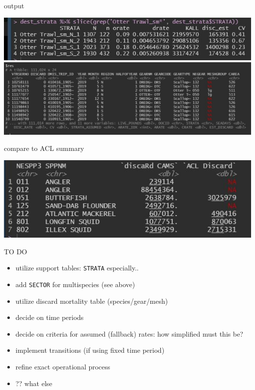 \documentclass[
  ignorenonframetext,
]{beamer}
\providecommand{\tightlist}{%
  \setlength{\itemsep}{0pt}\setlength{\parskip}{0pt}}
\begin{document}
\begin{frame}{output}
\protect\hypertarget{output}{}

\includegraphics[width = \textwidth]{dest_strata_squid_ex.jpg}
\vspace{2cm} \includegraphics[width = \textwidth]{squid_ex_table.jpg}

\end{frame}

\begin{frame}{compare to ACL summary}
\protect\hypertarget{compare-to-acl-summary}{}

\includegraphics[width = \textwidth]{CAMS_discaRd_ACL_comparison.jpg}

\end{frame}

\begin{frame}[fragile]{TO DO}
\protect\hypertarget{to-do}{}

\begin{itemize}
\tightlist
\item
  utilize support tables: \texttt{STRATA} especially..
\item
  add \texttt{SECTOR} for multispecies (see above)
\item
  utilize discard mortality table (species/gear/mesh)
\item
  decide on time periods
\item
  decide on criteria for assumed (fallback) rates: how simplified must
  this be?
\item
  implement transitions (if using fixed time period)
\item
  refine exact operational process
\item
  ?? what else
\end{itemize}

\end{frame}
\end{document}
